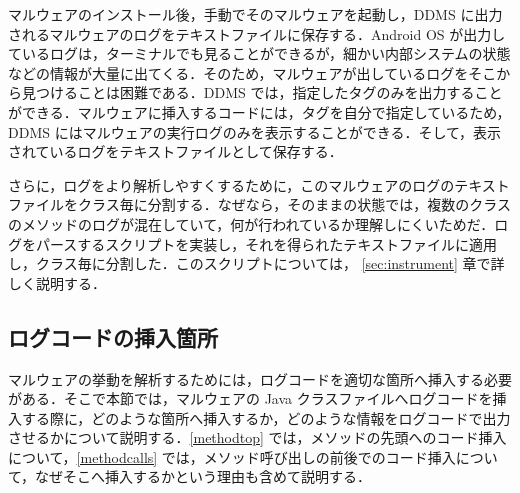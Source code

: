 マルウェアのインストール後，手動でそのマルウェアを起動し，DDMS に出力されるマルウェアのログをテキストファイルに保存する．Android OS が出力しているログは，ターミナルでも見ることができるが，細かい内部システムの状態などの情報が大量に出てくる．そのため，マルウェアが出しているログをそこから見つけることは困難である．DDMS では，指定したタグのみを出力することができる．マルウェアに挿入するコードには，タグを自分で指定しているため，DDMS にはマルウェアの実行ログのみを表示することができる．そして，表示されているログをテキストファイルとして保存する．

さらに，ログをより解析しやすくするために，このマルウェアのログのテキストファイルをクラス毎に分割する．なぜなら，そのままの状態では，複数のクラスのメソッドのログが混在していて，何が行われているか理解しにくいためだ．ログをパースするスクリプトを実装し，それを得られたテキストファイルに適用し，クラス毎に分割した．このスクリプトについては， \ref{sec:instrument} 章で詳しく説明する．

\subsection{ログコードの挿入箇所}
\label{placeinsert}
マルウェアの挙動を解析するためには，ログコードを適切な箇所へ挿入する必要がある．そこで本節では，マルウェアの Java クラスファイルへログコードを挿入する際に，どのような箇所へ挿入するか，どのような情報をログコードで出力させるかについて説明する．\ref{methodtop} では，メソッドの先頭へのコード挿入について，\ref{methodcalls} では，メソッド呼び出しの前後でのコード挿入について，なぜそこへ挿入するかという理由も含めて説明する．

